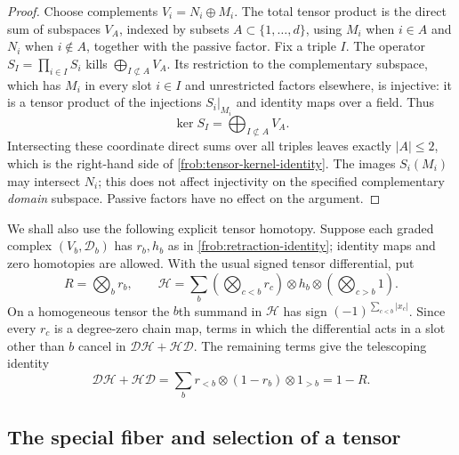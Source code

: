 \begin{proof}
Choose complements $V_i=N_i\oplus M_i$.  The total tensor product is
the direct sum of subspaces $V_A$, indexed by subsets
$A\subset\{1,\ldots,d\}$, using $M_i$ when $i\in A$ and $N_i$ when
$i\notin A$, together with the passive factor.  Fix a triple $I$.
The operator $S_I=\prod_{i\in I}S_i$ kills
$\bigoplus_{I\not\subset A}V_A$.  Its restriction to the complementary
subspace, which has $M_i$ in every slot $i\in I$ and unrestricted
factors elsewhere, is injective: it is a tensor product of the
injections $S_i|_{M_i}$ and identity maps over a field.  Thus
\[
                  \ker S_I=\bigoplus_{I\not\subset A}V_A.
\]
Intersecting these coordinate direct sums over all triples leaves
exactly $|A|\leq2$, which is the right-hand side of
\eqref{frob:tensor-kernel-identity}.  The images $S_i(M_i)$ may intersect
$N_i$; this does not affect injectivity on the specified complementary
\emph{domain} subspace.  Passive factors have no effect on the argument.
\end{proof}

We shall also use the following explicit tensor homotopy.  Suppose
each graded complex $(V_b,\mathcal D_b)$ has $r_b,h_b$ as in
\eqref{frob:retraction-identity}; identity maps and zero homotopies are
allowed.  With the usual signed tensor differential, put
\begin{equation}
 R=\bigotimes_b r_b,\qquad
 \mathcal H=\sum_b
      \left(\bigotimes_{c<b}r_c\right)\otimes h_b\otimes
      \left(\bigotimes_{c>b}1\right).
 \label{frob:tensor-homotopy}
\end{equation}
On a homogeneous tensor the $b$th summand in $\mathcal H$ has sign
$(-1)^{\sum_{c<b}|x_c|}$.  Since every $r_c$ is a degree-zero chain
map, terms in which the differential acts in a slot other than $b$
cancel in $\mathcal D\mathcal H+\mathcal H\mathcal D$.  The remaining
terms give the telescoping identity
\begin{equation}
 \mathcal D\mathcal H+\mathcal H\mathcal D
 =\sum_b r_{<b}\otimes(1-r_b)\otimes1_{>b}=1-R.
 \label{frob:tensor-homotopy-identity}
\end{equation}

\subsection{The special fiber and selection of a tensor}
\label{frob:special-fiber}

